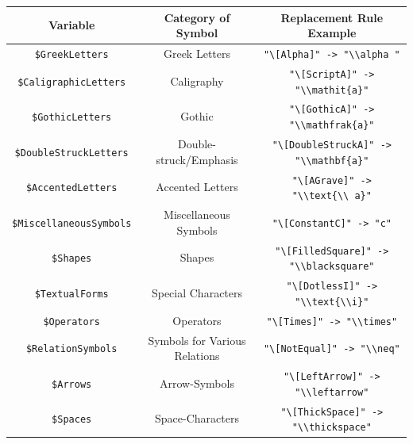 \begin{center}
    \begin{tabular}{||c c c||} 
         \hline
         Variable & Category of Symbol & Replacement Rule Example \\ [0.5ex] 
         \hline
         \hline
         \lstinline+$GreekLetters+ & Greek Letters & \lstinline+"\[Alpha]" -> "\\alpha "+ \\ 
         \hline
         \lstinline+$CaligraphicLetters+ & Caligraphy & \lstinline+"\[ScriptA]" -> "\\mathit{a}"+ \\
         \hline
         \lstinline+$GothicLetters+ & Gothic & \lstinline+"\[GothicA]" -> "\\mathfrak{a}"+ \\
         \hline
         \lstinline+$DoubleStruckLetters+ & Double-struck/Emphasis & \lstinline+"\[DoubleStruckA]" -> "\\mathbf{a}"+ \\
         \hline
         \lstinline+$AccentedLetters+ & Accented Letters & \lstinline+"\[AGrave]" -> "\\text{\\ a}"+ \\ [1ex] 
         \hline
         \lstinline+$MiscellaneousSymbols+ & Miscellaneous Symbols & \lstinline+"\[ConstantC]" -> "c"+ \\ 
         \hline
         \lstinline+$Shapes+ & Shapes & \lstinline+"\[FilledSquare]" -> "\\blacksquare"+ \\
         \hline
         \lstinline+$TextualForms+ & Special Characters & \lstinline+"\[DotlessI]" -> "\\text{\\i}"+ \\
         \hline
         \lstinline+$Operators+ & Operators & \lstinline+"\[Times]" -> "\\times"+ \\
         \hline
         \lstinline+$RelationSymbols+ & Symbols for Various Relations & \lstinline+"\[NotEqual]" -> "\\neq"+ \\ [1ex] 
         \hline
         \lstinline+$Arrows+ & Arrow-Symbols & \lstinline+"\[LeftArrow]" -> "\\leftarrow"+ \\ [1ex] 
         \hline
         \lstinline+$Spaces+ & Space-Characters & \lstinline+"\[ThickSpace]" -> "\\thickspace"+ \\ 

\end{tabular}
\end{center}
